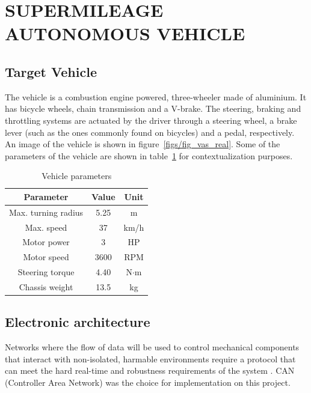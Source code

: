 \documentclass[twocolumn,10pt]{asme2e}
\begin{document}
\section*{SUPERMILEAGE AUTONOMOUS VEHICLE}

\subsection*{Target Vehicle}
The vehicle is a combustion engine powered, three-wheeler made of
aluminium. It has bicycle wheels, chain transmission and a V-brake.
The steering, braking and throttling systems are actuated by the
driver through a steering wheel, a brake lever (such as the ones commonly
found on bicycles) and a pedal, respectively. An image of the
vehicle is shown in figure~\ref{figs/fig_vas_real}. Some of the
parameters of the vehicle are shown in table~\ref{vas_params}
for contextualization purposes.

\begin{table}[ht!]
\centering
\begin{tabular}{ c | c | c }
\hline
Parameter & Value & Unit\\
\hline
Max. turning radius & 5.25 & m \\
Max. speed & 37 & km/h \\
Motor power & 3 & HP \\
Motor speed & 3600 & RPM \\
Steering torque & 4.40 & N$\cdot$m\\
Chassis weight & 13.5 & kg\\
\hline
\end{tabular}
\caption{Vehicle parameters}
\label{vas_params}
\end{table}

\subsection*{Electronic architecture}
Networks where the flow of data will be used to control mechanical
components that interact with non-isolated, harmable environments require a
protocol that can meet the hard real-time and robustness requirements of the system \cite{hchen}.
CAN (Controller Area Network) was the choice for implementation on this project.
\end{document}
